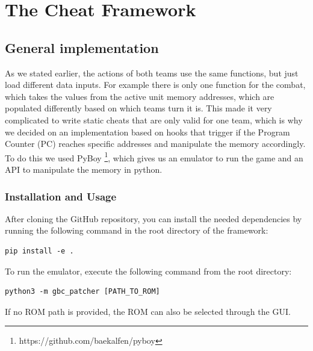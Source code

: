 \section{The Cheat Framework}

\subsection{General implementation}
As we stated earlier, the actions of both teams use the same functions, but just load different data inputs. For example there is only one function for the combat, which takes the values from the active unit memory addresses, which are populated differently based on which teams turn it is. This made it very complicated to write static cheats that are only valid for one team, which is why we decided on an implementation based on hooks that trigger if the Program Counter (PC) reaches specific addresses and manipulate the memory accordingly.
To do this we used PyBoy \footnote{https://github.com/baekalfen/pyboy}, which gives us an emulator to run the game and an API to manipulate the memory in python.

\subsubsection{Installation and Usage}
After cloning the GitHub repository, you can install the needed dependencies
by running the following command in the root directory of the framework:

\begin{lstlisting}[style=shell]
	pip install -e .
\end{lstlisting}

To run the emulator, execute the following command from the root directory:

\begin{lstlisting}[style=shell]
	python3 -m gbc_patcher [PATH_TO_ROM]
\end{lstlisting}

If no ROM path is provided, the ROM can also be selected through the GUI.